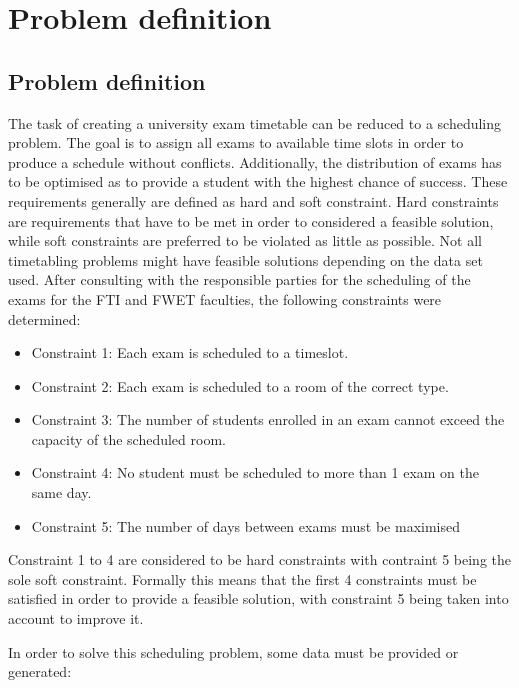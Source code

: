 
\section{Problem definition}\label{sec:problem}

 \subsection{Problem definition}

The task of creating a university exam timetable can be reduced to a scheduling problem. The goal is to assign all exams to available time slots in order to produce a schedule without conflicts. Additionally, the distribution of exams has to be optimised as to provide a student with the highest chance of success. These requirements generally are defined as hard and soft constraint. Hard constraints are requirements that have to be met in order to considered a feasible solution, while soft constraints are preferred to be violated as little as possible. Not all timetabling problems might have feasible solutions depending on the data set used. After consulting with the responsible parties for the scheduling of the exams for the FTI and FWET faculties, the following constraints were determined:
\begin{itemize}
    \item Constraint 1: Each exam is scheduled to a timeslot.
    \item Constraint 2: Each exam is scheduled to a room of the correct type.
    \item Constraint 3: The number of students enrolled in an exam cannot exceed the capacity of the scheduled room.
    \item Constraint 4: No student must be scheduled to more than 1 exam on the same day.
    \item Constraint 5: The number of days between exams must be maximised
\end{itemize}
Constraint 1 to 4 are considered to be hard constraints with contraint 5 being the sole soft constraint. Formally this means that the first 4 constraints must be satisfied in order to provide a feasible solution, with constraint 5 being taken into account to improve it.

In order to solve this scheduling problem, some data must be provided or generated:

